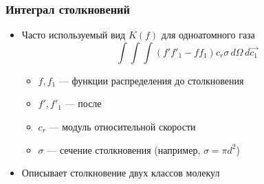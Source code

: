 \documentclass[onlymath]{beamer}
\begin{document}
\begin{frame}
  \frametitle{Интеграл столкновений}
  \begin{itemize}
  \item Часто используемый вид $K(f)$ для одноатомного газа
    \begin{equation*}
      \int\int\int(f'f'_1-f f_1) {c_r \sigma \,d\Omega\,d\vec{c_1}}
    \end{equation*}
    \begin{itemize}
    \item $f, f_1$ — функции распределения до столкновения
    \item $f', f'_1$ — после
    \item $c_r$ — модуль относительной скорости
    \item $\sigma$ — сечение столкновения (например, $\sigma = \pi d^2$)
    \end{itemize}
  \item Описывает столкновение двух классов молекул
  \end{itemize}
\end{frame}
\end{document}
